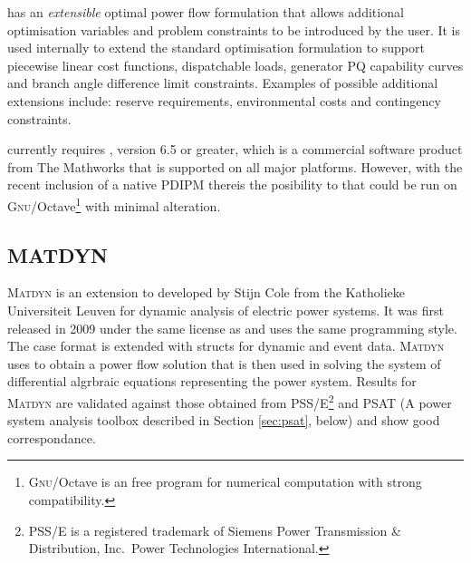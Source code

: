 \matpower has an \textit{extensible} optimal power flow formulation that allows
additional optimisation variables and problem constraints to be introduced by
the user.  It is used internally to extend the standard optimisation
formulation to support piecewise linear cost functions, dispatchable loads,
generator PQ capability curves and branch angle difference limit constraints.
Examples of possible additional extensions include: reserve requirements,
environmental costs and contingency constraints.

\matpower currently requires \matlab, version 6.5 or greater, which is a
commercial software product from The Mathworks that is supported on all
major platforms.  However, with the recent inclusion of a native PDIPM thereis
the posibility to that \matpower could be run on
\textsc{Gnu}/Octave\footnote{\textsc{Gnu}/Octave is an free program for
numerical computation with strong \matlab compatibility.} with minimal
alteration.

\subsection{MATDYN}
\textsc{Matdyn} is an extension to \matpower developed by Stijn Cole from the
Katholieke Universiteit Leuven for dynamic analysis of electric power systems.
It was first released in 2009 under the same license as \matpower and uses the
same programming style.  The \matpower case format is extended with structs
for dynamic and event data.  \textsc{Matdyn} uses \matpower to obtain a power
flow solution that is then used in solving the system of differential
algrbraic equations representing the power system.  Results for \textsc{Matdyn}
are validated against those obtained from PSS/E\footnote{PSS/E is a
registered trademark of Siemens Power Transmission \& Distribution, Inc.~Power
Technologies International.} and PSAT (A power system analysis toolbox
described in Section \ref{sec:psat}, below) and show good correspondance.


